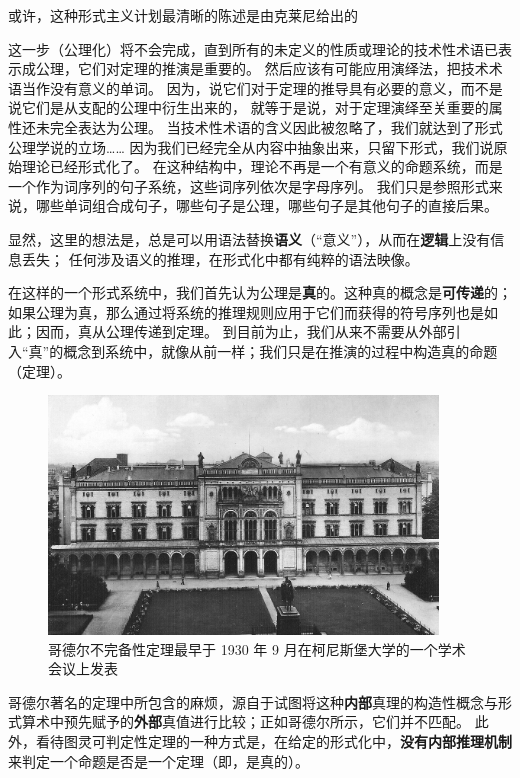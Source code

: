 \documentclass[a4paper,12pt]{article}
\begin{document}
或许，这种形式主义计划最清晰的陈述是由克莱尼给出的\cite{KleeneSC1952}

\begin{displayquote}
这一步（\gls{公理化}）将不会完成，直到所有的未定义的性质或理论的技术性术语已表示成\gls{公理}，它们对\gls{定理}的推演是重要的。
然后应该有可能应用演绎法，把技术术语当作没有意义的单词。
因为，说它们对于定理的推导具有必要的意义，而不是说它们是从支配的公理中衍生出来的，
就等于是说，对于定理演绎至关重要的属性还未完全表达为公理。
当技术性术语的含义因此被忽略了，我们就达到了形式公理学说的立场……
因为我们已经完全从内容中抽象出来，只留下形式，我们说原始理论已经形式化了。
在这种结构中，理论不再是一个有意义的命题系统，而是一个作为词序列的句子系统，这些词序列依次是字母序列。
我们只是参照\gls{形式}来说，哪些单词组合成句子，哪些句子是公理，哪些句子是其他句子的直接后果。
\end{displayquote}

显然，这里的想法是，总是可以用语法替换\textbf{语义}（“意义”），从而在\textbf{逻辑}上没有信息丢失；
任何涉及语义的推理，在形式化中都有纯粹的语法映像。

在这样的一个形式系统中，我们首先认为公理是\textbf{真}的。这种真的概念是\textbf{可传递}的；
如果公理为真，那么通过将系统的\gls{推理规则}应用于它们而获得的符号序列也是如此；因而，真从公理传递到定理。
到目前为止，我们从来不需要从外部引入“真”的概念到系统中，就像从前一样；我们只是在推演的过程中构造真的命题（定理）。

\begin{figure}[ht]
\centering
\includegraphics[height=2.5in]{images/konigsberger_university.jpg}
\caption{哥德尔不完备性定理最早于 1930 年 9 月在柯尼斯堡大学的一个学术会议上发表}
\end{figure}

哥德尔著名的定理\cite{GodelK1931}中所包含的麻烦，源自于试图将这种\textbf{内部}真理的构造性概念与\gls{形式算术}中预先赋予的\textbf{外部}真值进行比较；正如哥德尔所示，它们并不匹配。
此外，看待图灵可判定性定理\cite{TuringA1937}的一种方式是，在给定的形式化中，\textbf{没有内部推理机制}来判定一个命题是否是一个定理（即，是真的）。
\end{document}
